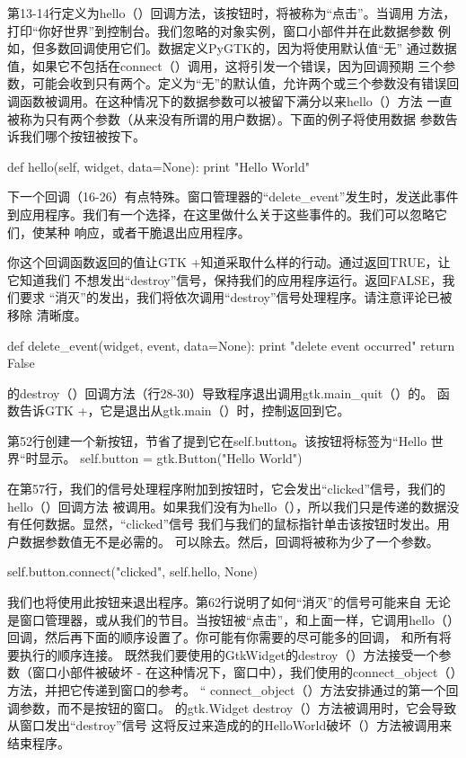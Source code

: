 第13-14行定义为hello（）回调方法，该按钮时，将被称为“点击”。当调用
方法，打印“你好世界”到控制台。我们忽略的对象实例，窗口小部件并在此数据参数
例如，但多数回调使用它们。数据定义PyGTK的，因为将使用默认值“无”
通过数据值，如果它不包括在connect（）调用，这将引发一个错误，因为回调预期
三个参数，可能会收到只有两个。定义为“无”的默认值，允许两个或三个参数没有错误回调函数被调用。在这种情况下的数据参数可以被留下满分以来hello（）方法
一直被称为只有两个参数（从来没有所谓的用户数据）。下面的例子将使用数据
参数告诉我们哪个按钮被按下。

def hello(self, widget, data=None):
print "Hello World"

下一个回调（16-26）有点特殊。窗口管理器的“delete\_event”发生时，发送此事件
到应用程序。我们有一个选择，在这里做什么关于这些事件的。我们可以忽略它们，使某种
响应，或者干脆退出应用程序。


你这个回调函数返回的值让GTK +知道采取什么样的行动。通过返回TRUE，让它知道我们
不想发出“destroy”信号，保持我们的应用程序运行。返回FALSE，我们要求
“消灭”的发出，我们将依次调用“destroy”信号处理程序。请注意评论已被移除
清晰度。


def delete\_event(widget, event, data=None):
print "delete event occurred"
return False

的destroy（）回调方法（行28-30）导致程序退出调用gtk.main\_quit（）的。
函数告诉GTK +，它是退出从gtk.main（）时，控制返回到它。

第52行创建一个新按钮，节省了提到它在self.button。该按钮将标签为“Hello
世界“时显示。	
self.button = gtk.Button("Hello World")

在第57行，我们的信号处理程序附加到按钮时，它会发出“clicked”信号，我们的hello（）回调方法
被调用。如果我们没有为hello（），所以我们只是传递的数据没有任何数据。显然，“clicked”信号
我们与我们的鼠标指针单击该按钮时发出。用户数据参数值无不是必需的。
可以除去。然后，回调将被称为少了一个参数。

self.button.connect("clicked", self.hello, None)

我们也将使用此按钮来退出程序。第62行说明了如何“消灭”的信号可能来自
无论是窗口管理器，或从我们的节目。当按钮被“点击”，和上面一样，它调用hello（）
回调，然后再下面的顺序设置了。你可能有你需要的尽可能多的回调，
和所有将要执行的顺序连接。
既然我们要使用的GtkWidget的destroy（）方法接受一个参数（窗口小部件被破坏
 - 在这种情况下，窗口中），我们使用的connect\_object（）方法，并把它传递到窗口的参考。 “
 connect\_object（）方法安排通过的第一个回调参数，而不是按钮的窗口。
 的gtk.Widget destroy（）方法被调用时，它会导致从窗口发出“destroy”信号
 这将反过来造成的的HelloWorld破坏（）方法被调用来结束程序。


